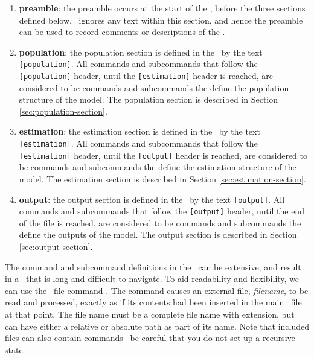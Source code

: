 \begin{enumerate}
\item \textbf{preamble}: 
the preamble occurs at the start of the \config, before the three sections defined below. \SPM\ ignores any text within this section, and hence the preamble can be used to record comments or descriptions of the \config. 

\item \textbf{population}: 
the population section is defined in the \config\ by the text \texttt{[population]}. All commands and subcommands that follow the \texttt{[population]} header, until the \texttt{[estimation]} header is reached, are considered to be commands and subcommands the define the population structure of the model. The population section is described in Section \ref{sec:population-section}.

\item \textbf{estimation}:
the estimation section is defined in the \config\ by the text \texttt{[estimation]}. All commands and subcommands that follow the \texttt{[estimation]} header, until the \texttt{[output]} header is reached, are considered to be commands and subcommands the define the estimation structure of the model.  The estimation section is described in Section \ref{sec:estimation-section}.

\item \textbf{output}:
the output section is defined in the \config\ by the text \texttt{[output]}. All commands and subcommands that follow the \texttt{[output]} header, until the end of the file is reached, are considered to be commands and subcommands the define the outputs of the model.  The output section is described in Section \ref{sec:output-section}.

\end{enumerate}

The command and subcommand definitions in the \config\ can be extensive, and result in a \config\ that is long and difficult to navigate. To aid readability and flexibility, we can use the \config\ file command . The command causes an external file, \emph{filename}, to be read and processed, exactly as if its contents had been inserted in the main \config\ file at that point. The file name must be a complete file name with extension, but can have either a relative or absolute path as part of its name. Note that included files can also contain  commands \textemdash\ be careful that you do not set up a recursive state.


